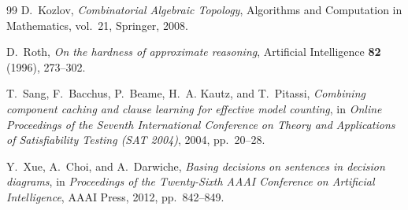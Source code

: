 \documentclass[11pt]{article}
\theoremstyle{definition}
\theoremstyle{remark}
\begin{document}
\begin{thebibliography}{99}
D.~Kozlov,
\emph{Combinatorial Algebraic Topology},
Algorithms and Computation in Mathematics, vol.~21, Springer, 2008.

D.~Roth,
\emph{On the hardness of approximate reasoning},
Artificial Intelligence \textbf{82} (1996), 273--302.

T.~Sang, F.~Bacchus, P.~Beame, H.~A. Kautz, and T.~Pitassi,
\emph{Combining component caching and clause learning for effective model counting},
in \emph{Online Proceedings of the Seventh International Conference on Theory and Applications of Satisfiability Testing (SAT 2004)},
2004, pp.~20--28.

Y.~Xue, A.~Choi, and A.~Darwiche,
\emph{Basing decisions on sentences in decision diagrams},
in \emph{Proceedings of the Twenty-Sixth AAAI Conference on Artificial Intelligence},
AAAI Press, 2012, pp.~842--849.
\end{thebibliography}
\end{document}
